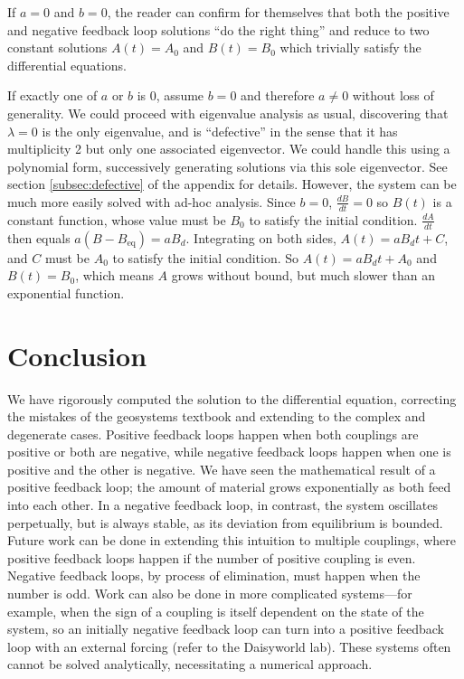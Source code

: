 \documentclass[11pt, oneside]{article}
\theoremstyle{plain}
\theoremstyle{definition}
\begin{document}
If \( a = 0 \) and \( b = 0 \), the reader can confirm for themselves that
both the positive and negative feedback loop solutions
\enquote{do the right thing} and reduce to two constant solutions
\( A(t) = A_0 \) and \( B(t) = B_0 \) which trivially
satisfy the differential equations.

If exactly one of \( a \) or \( b \) is 0, assume \( b = 0 \) and therefore
\( a \neq 0 \) without loss of generality. We could proceed with eigenvalue
analysis as usual, discovering that \( \lambda = 0 \) is the only eigenvalue,
and is \enquote{defective} in the sense that it has multiplicity 2 but only
one associated eigenvector. We could handle this using a polynomial form,
successively generating solutions via this sole eigenvector.
See section \ref{subsec:defective} of the appendix for details.
However, the system can be much more easily solved with ad-hoc analysis.
Since \( b = 0 \), \( \frac{dB}{dt} = 0 \) so \( B(t) \) is a constant function,
whose value must be \( B_0 \) to satisfy the initial condition.
\( \frac{dA}{dt} \) then equals \( a(B - B_\text{eq}) = aB_d \).
Integrating on both sides, \( A(t) = aB_d t + C \),
and \( C \) must be \( A_0 \) to satisfy the initial condition.
So \( A(t) = aB_d t + A_0 \) and \( B(t) = B_0 \),
which means \( A \) grows without bound, but much slower than an exponential function.

\section{Conclusion}

We have rigorously computed the solution to the differential equation,
correcting the mistakes of the geosystems textbook and extending 
to the complex and degenerate cases.
Positive feedback loops happen when both couplings are
positive or both are negative, while negative feedback loops happen
when one is positive and the other is negative.
We have seen the mathematical result of a positive feedback loop;
the amount of material grows exponentially as both feed into each other.
In a negative feedback loop, in contrast, the system oscillates perpetually,
but is always stable, as its deviation from equilibrium is bounded.
Future work can be done in extending this intuition to multiple couplings,
where positive feedback loops happen if the number of positive coupling is even.
Negative feedback loops, by process of elimination,
must happen when the number is odd.
Work can also be done in more complicated systems---for example,
when the sign of a coupling is itself dependent on the state of the system,
so an initially negative feedback loop can turn into a positive feedback loop
with an external forcing (refer to the Daisyworld lab).
These systems often cannot be solved analytically,
necessitating a numerical approach.
\end{document}
